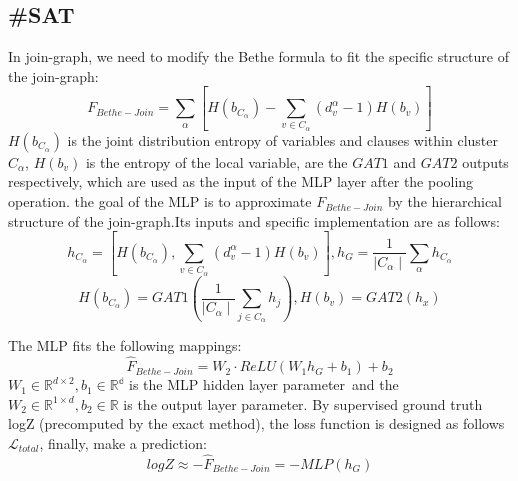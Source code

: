 \subsection{\#SAT}
In join-graph, we need to modify the Bethe formula to fit the specific structure of the join-graph:
\begin{equation}
   F_{Bethe-Join}=\sum_\alpha [H(b_{C_\alpha})-\sum_{v\in C_\alpha}(d_v^\alpha-1)H(b_v)]
\end{equation}
\(H(b_{C_\alpha})\) is the joint distribution entropy of variables and clauses within cluster \(C_\alpha\), \(H(b_v)\) is the entropy of the local variable, are the \(GAT1\) and \(GAT2\) outputs respectively, which are used as the input of the MLP layer after the pooling operation. the goal of the MLP is to approximate \(F_{Bethe-Join}\) by  the hierarchical structure of the join-graph.Its inputs and specific implementation are as follows:
\begin{equation}
    h_{C_\alpha}=[H(b_{C_\alpha}), \sum_{v\in C_\alpha}(d_v^\alpha-1)H(b_v)], h_G=\frac{1}{\mid{C_\alpha}\mid}\sum_\alpha h_{C_\alpha}
\end{equation}
\begin{equation}
   H(b_{C_\alpha})=GAT1(\frac{1}{ \mid C_\alpha\mid}\sum_{j\in C_\alpha}h_j), H(b_v)=GAT2(h_x)
\end{equation}

The MLP fits the following mappings:
\begin{equation}
    \hat{F}_{Bethe-Join}=W_2\cdot ReLU(W_1h_G+b_1)+b_2
\end{equation}
\( W_1\in\mathbb{R}^{d\times 2}, b_1\in \mathbb{R^d}\) is the MLP hidden layer parameter\
and the \(W_2\in\mathbb{R}^{1\times d} , b_2\in \mathbb{R}\) is the output layer parameter. By supervised ground truth logZ (precomputed by the exact method), the loss function is designed as follows \(\mathcal L_{total}\), finally, make a prediction:
\begin{equation}
    logZ\approx -\hat{F}_{Bethe-Join}=-MLP(h_G)
\end{equation}